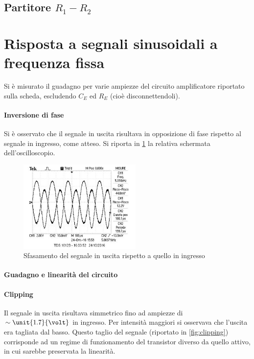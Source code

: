 \documentclass[10pt,a4paper]{article}
\begin{document}
\subsection{Partitore $R_1-R_2$}

\section{Risposta a segnali sinusoidali a frequenza fissa}
Si è misurato il guadagno per varie ampiezze del circuito amplificatore riportato sulla scheda, escludendo $C_E$ ed $R_E$ (cioè disconnettendoli).

\paragraph{Inversione di fase} Si è osservato che il segnale in uscita risultava in opposizione di fase rispetto al segnale in ingresso, come atteso. Si riporta in \figurename{\ref{fig:sfasamento}} la relativa schermata dell'oscilloscopio.

\begin{figure}[h!]
	\centering
	\includegraphics[width=0.54\textwidth]{../oscilloscopio/sfasamento.jpg}
	\caption{Sfasamento del segnale in uscita rispetto a quello in ingresso}
	\label{fig:sfasamento}
\end{figure}

\paragraph{Guadagno e linearità del circuito}

\paragraph{Clipping}
Il segnale in uscita risultava simmetrico fino ad ampiezze di $\sim \unit{1.7}{\volt}$ in ingresso.
Per intensità maggiori si osservava che l'uscita era tagliata dal basso. Questo taglio del segnale (riportato in \figurename{\ref{fig:clipping}}) corrisponde ad un regime di funzionamento del transistor diverso da quello attivo, in cui sarebbe preservata la linearità.
\end{document}
